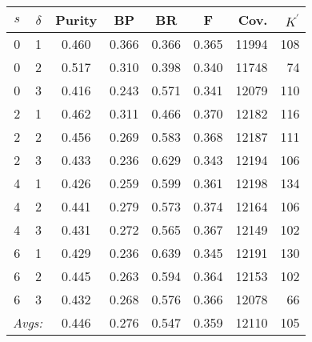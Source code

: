 \begin{table}[!h]
{%
\small
\centering
\setlength{\extrarowheight}{3pt}
\begin{tabular}{cc|ccccrr}
$s$ & $\delta$ & Purity &  BP & BR & F & Cov. & $K^{\prime}$ \\ \hline\hline
0 & 1 & 0.460 & 0.366 & 0.366 & 0.365 & 11994 & 108 \\
0 & 2 & 0.517 & 0.310 & 0.398 & 0.340 & 11748 & 74 \\
0 & 3 & 0.416 & 0.243 & 0.571 & 0.341 & 12079 & 110 \\ \hline %
2 & 1 & 0.462 & 0.311 & 0.466 & 0.370 & 12182 & 116 \\
2 & 2 & 0.456 & 0.269 & 0.583 & 0.368 & 12187 & 111 \\%
2 & 3 & 0.433 & 0.236 & 0.629 & 0.343 & 12194 & 106 \\ \hline %
4 & 1 & 0.426 & 0.259 & 0.599 & 0.361 & 12198 & 134 \\  %
4 & 2 & 0.441 & 0.279 & 0.573 & 0.374 & 12164 & 106 \\
4 & 3 & 0.431 & 0.272 & 0.565 & 0.367 & 12149 & 102 \\ \hline %
6 & 1 & 0.429 & 0.236 & 0.639 & 0.345 & 12191 & 130 \\  %
6 & 2 & 0.445 & 0.263 & 0.594 & 0.364 & 12153 & 102 \\
6 & 3 & 0.432 & 0.268 & 0.576 & 0.366 & 12078 & 66 \\ \hline \hline %
 \multicolumn{2}{r|}{\textit{Avgs:}} & 0.446 & 0.276 & 0.547 & 0.359 & 12110 & 105 \\
\end{tabular}
}\\
\end{table}
